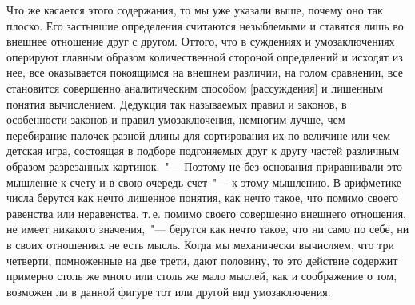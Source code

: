 
Что же касается этого содержания, то мы уже указали
выше, почему оно так плоско. Его застывшие
определения считаются незыблемыми и ставятся лишь
во внешнее отношение друг с другом. Оттого, что в суждениях
и умозаключениях оперируют главным образом
количественной стороной определений и исходят из нее,
все оказывается покоящимся на внешнем различии, на
голом сравнении, все становится совершенно аналитическим
способом [рассуждения] и лишенным понятия
вычислением. Дедукция так называемых правил и законов,
в особенности законов и правил умозаключения,
немногим лучше, чем перебирание палочек разной длины
для сортирования их по величине или чем детская игра,
состоящая в подборе подгоняемых друг к другу частей
различным образом разрезанных картинок.~"--- Поэтому не
без основания приравнивали это мышление к счету и в
свою очередь счет~"--- к этому мышлению. В арифметике
числа берутся как нечто лишенное понятия, как нечто такое,
что помимо своего равенства или неравенства, т.\,е.
помимо своего совершенно внешнего отношения, не имеет
никакого значения,~"--- берутся как нечто такое, что
ни само по себе, ни в своих отношениях не есть мысль.
Когда мы механически вычисляем, что три четверти,
помноженные на две трети, дают половину, то это действие
содержит примерно столь же много или столь же
мало мыслей, как и соображение о том, возможен ли в
данной фигуре тот или другой вид умозаключения.

